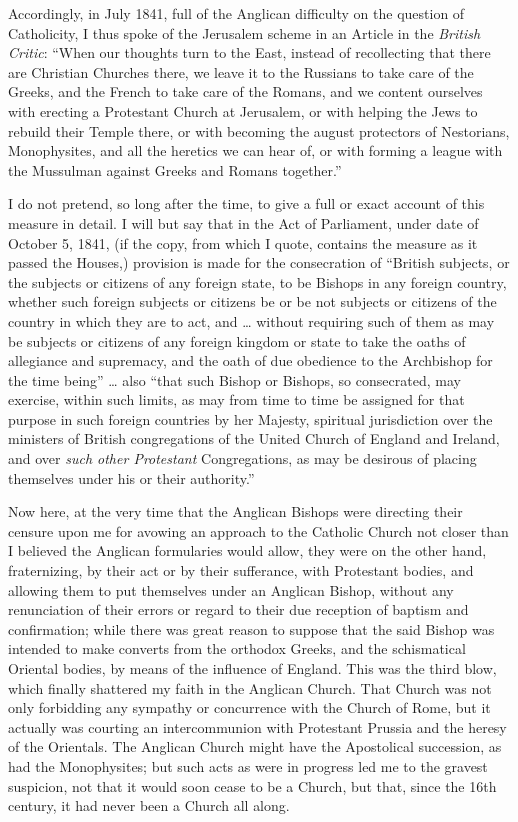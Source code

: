 Accordingly, in July 1841, full of the Anglican difficulty on the
question of Catholicity, I thus spoke of the Jerusalem scheme in an
Article in the \emph{British Critic}: ``When our thoughts turn to the East,
instead of recollecting that there are Christian Churches there, we
leave it to the Russians to take care of the Greeks, and the French to
take care of the Romans, and we content ourselves with erecting a
Protestant Church at Jerusalem, or with helping the Jews to rebuild
their Temple there, or with becoming the august protectors of
Nestorians, Monophysites, and all the heretics we can hear of, or with
forming a league with the Mussulman against Greeks and Romans
together.''

I do not pretend, so long after the time, to give a full or exact
account of this measure in detail. I will but say that in the Act of
Parliament, under date of October 5, 1841, (if the copy, from which I
quote, contains the measure as it passed the Houses,) provision is made
for the consecration of ``British subjects, or the subjects or
citizens of any foreign state, to be Bishops in any foreign
country, whether such foreign subjects or citizens be or be not subjects
or citizens of the country in which they are to act, and … without
requiring such of them as may be subjects or citizens of any foreign
kingdom or state to take the oaths of allegiance and supremacy, and the
oath of due obedience to the Archbishop for the time being'' …
also ``that such Bishop or Bishops, so consecrated, may exercise,
within such limits, as may from time to time be assigned for that
purpose in such foreign countries by her Majesty, spiritual jurisdiction
over the ministers of British congregations of the United Church of
England and Ireland, and over \emph{such other Protestant}
Congregations, as may be desirous of placing themselves under his or
their authority.''

Now here, at the very time that the Anglican Bishops were directing
their censure upon me for avowing an approach to the Catholic Church not
closer than I believed the Anglican formularies would allow, they were
on the other hand, fraternizing, by their act or by their sufferance,
with Protestant bodies, and allowing them to put themselves under an
Anglican Bishop, without any renunciation of their errors or regard to
their due reception of baptism and confirmation; while there was
great reason to suppose that the said Bishop was intended to make
converts from the orthodox Greeks, and the schismatical Oriental bodies,
by means of the influence of England. This was the third blow, which
finally shattered my faith in the Anglican Church. That Church was not
only forbidding any sympathy or concurrence with the Church of Rome, but
it actually was courting an intercommunion with Protestant Prussia and
the heresy of the Orientals. The Anglican Church might have the
Apostolical succession, as had the Monophysites; but such acts as were
in progress led me to the gravest suspicion, not that it would soon
cease to be a Church, but that, since the 16th century, it had
never been a Church all along.

